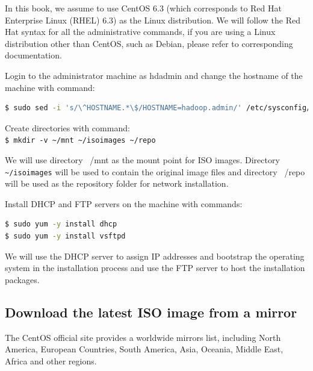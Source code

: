 In this book, we assume to use CentOS 6.3 (which corresponds to Red Hat Enterprise Linux (RHEL) 6.3) as the Linux distribution. We will follow the Red Hat syntax for all the administrative commands, if you are using a Linux distribution other than CentOS, such as Debian, please refer to corresponding documentation.

Login to the administrator machine as hdadmin and change the hostname of the machine with command:
\lstset{style=bashstyle}
\begin{lstlisting}[language=bash]
$ sudo sed -i 's/\^HOSTNAME.*\$/HOSTNAME=hadoop.admin/' /etc/sysconfig/network
\end{lstlisting}
Create directories with command: \\
\verb|$ mkdir -v ~/mnt ~/isoimages ~/repo|

We will use directory ~/mnt as the mount point for ISO images. Directory \verb|~/isoimages| will be used to contain the original image files and directory ~/repo will be used as the repository folder for network installation.

Install DHCP and FTP servers on the machine with commands: 
\lstset{style=bashstyle}
\begin{lstlisting}[language=bash]
$ sudo yum -y install dhcp
$ sudo yum -y install vsftpd
\end{lstlisting}

We will use the DHCP server to assign IP addresses and bootstrap the operating system in the installation process and use the FTP server to host the installation packages.
\subsection*{Download the latest ISO image from a mirror}
The CentOS official site provides a worldwide mirrors list, including North America, European Countries, South America, Asia, Oceania, Middle East, Africa and other regions.


